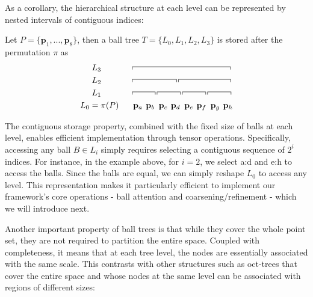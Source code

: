 As a corollary, the hierarchical structure at each level can be represented by nested intervals of contiguous indices:

\begin{example}
Let $P = \{\mathbf{p}_1, ..., \mathbf{p}_8\}$, then a ball tree $T = \{L_0, L_1, L_2, L_3\}$ is stored after the permutation $\pi$ as 
\begin{align}
    \notag
    L_3 \hspace{35pt} &\overbracket[0.5pt]{\hspace{118pt}} 
    \\ \notag
    L_2 \hspace{35pt} &\overbracket[0.5pt]{\hspace{53.5pt}} \overbracket[0.5pt]{\hspace{63pt}}
    \\ \notag
    L_1 \hspace{35pt} &
    \overbracket[0.5pt]{\hspace{28pt}}
    \overbracket[0.5pt]{\hspace{28.5pt}}
    \overbracket[0.5pt]{\hspace{28.5pt}}
    \overbracket[0.5pt]{\hspace{28.5pt}}
    \\ \notag
    L_0 = \pi(P) \hspace{14pt}
    &
    \hspace{3pt} \mathbf{p}_a \hspace{4pt} \mathbf{p}_b \hspace{5pt} \mathbf{p}_c \hspace{4pt} \mathbf{p}_d \hspace{5pt} \mathbf{p}_e \hspace{4pt} \mathbf{p}_f \hspace{5pt} \mathbf{p}_g \hspace{4pt} \mathbf{p}_h
\end{align}
\end{example}
\vspace{-5pt}
The contiguous storage property, combined with the fixed size of balls at each level, enables efficient implementation through tensor operations. Specifically, accessing any ball $B \in L_i$ simply requires selecting a contiguous sequence of $2^i$ indices. For instance, in the example above, for $i=2$, we select a:d and e:h to access the balls. Since the balls are equal, we can simply reshape $L_0$ to access any level. This representation makes it particularly efficient to implement our framework's core operations - ball attention and coarsening/refinement - which we will introduce next.

Another important property of ball trees is that while they cover the whole point set, they are not required to partition the entire space. Coupled with completeness, it means that at each tree level, the nodes are essentially associated with the same scale. This contrasts with other structures such as oct-trees that cover the entire space and whose nodes at the same level can be associated with regions of different sizes: 
